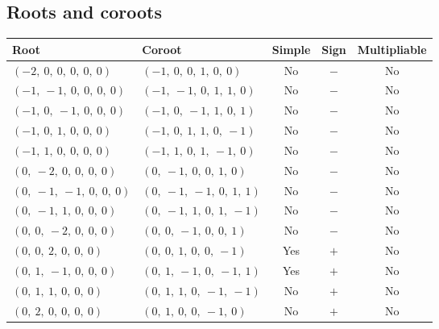 \documentclass[11pt]{article}
\theoremstyle{definition}
\begin{document}
\subsection{Roots and coroots}
\begin{center}
\begin{tabular}{|l|l|c|c|c|}
    \hline
    \textbf{Root} & \textbf{Coroot} & \textbf{Simple} & \textbf{Sign} & \textbf{Multipliable} \\
    \hline
    $\left( -2, \  0, \  0, \  0, \  0, \  0\right)$ & $\left( -1, \  0, \  0, \  1, \  0, \  0\right)$ & No & $-$ & No \\
    \hline
    $\left( -1, \  -1, \  0, \  0, \  0, \  0\right)$ & $\left( -1, \  -1, \  0, \  1, \  1, \  0\right)$ & No & $-$ & No \\
    \hline
    $\left( -1, \  0, \  -1, \  0, \  0, \  0\right)$ & $\left( -1, \  0, \  -1, \  1, \  0, \  1\right)$ & No & $-$ & No \\
    \hline
    $\left( -1, \  0, \  1, \  0, \  0, \  0\right)$ & $\left( -1, \  0, \  1, \  1, \  0, \  -1\right)$ & No & $-$ & No \\
    \hline
    $\left( -1, \  1, \  0, \  0, \  0, \  0\right)$ & $\left( -1, \  1, \  0, \  1, \  -1, \  0\right)$ & No & $-$ & No \\
    \hline
    $\left( 0, \  -2, \  0, \  0, \  0, \  0\right)$ & $\left( 0, \  -1, \  0, \  0, \  1, \  0\right)$ & No & $-$ & No \\
    \hline
    $\left( 0, \  -1, \  -1, \  0, \  0, \  0\right)$ & $\left( 0, \  -1, \  -1, \  0, \  1, \  1\right)$ & No & $-$ & No \\
    \hline
    $\left( 0, \  -1, \  1, \  0, \  0, \  0\right)$ & $\left( 0, \  -1, \  1, \  0, \  1, \  -1\right)$ & No & $-$ & No \\
    \hline
    $\left( 0, \  0, \  -2, \  0, \  0, \  0\right)$ & $\left( 0, \  0, \  -1, \  0, \  0, \  1\right)$ & No & $-$ & No \\
    \hline
    $\left( 0, \  0, \  2, \  0, \  0, \  0\right)$ & $\left( 0, \  0, \  1, \  0, \  0, \  -1\right)$ & Yes & $+$ & No \\
    \hline
    $\left( 0, \  1, \  -1, \  0, \  0, \  0\right)$ & $\left( 0, \  1, \  -1, \  0, \  -1, \  1\right)$ & Yes & $+$ & No \\
    \hline
    $\left( 0, \  1, \  1, \  0, \  0, \  0\right)$ & $\left( 0, \  1, \  1, \  0, \  -1, \  -1\right)$ & No & $+$ & No \\
    \hline
    $\left( 0, \  2, \  0, \  0, \  0, \  0\right)$ & $\left( 0, \  1, \  0, \  0, \  -1, \  0\right)$ & No & $+$ & No \\

\end{tabular}
\end{center}
\end{document}
